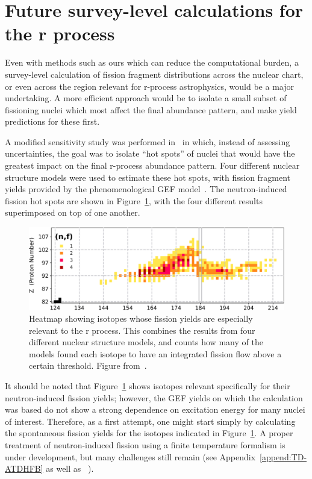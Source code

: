 \section{Future survey-level calculations for the r process}

Even with methods such as ours which can reduce the computational burden, a survey-level calculation of fission fragment distributions across the nuclear chart, or even across the region relevant for r-process astrophysics, would be a major undertaking. A more efficient approach would be to isolate a small subset of fissioning nuclei which most affect the final abundance pattern, and make yield predictions for these first.

A modified sensitivity study was performed in~\cite{Vassh2019} in which, instead of assessing uncertainties, the goal was to isolate ``hot spots'' of nuclei that would have the greatest impact on the final r-process abundance pattern. Four different nuclear structure models were used to estimate these hot spots, with fission fragment yields provided by the phenomenological GEF model~\cite{Schmidt2016}. The neutron-induced fission hot spots are shown in Figure~\ref{fig:rprocimportant-fissions}, with the four different results superimposed on top of one another.

\begin{figure}
	\centering
	\includegraphics[width=0.7\linewidth]{TeX_files/rProc_important-fissions}
	\caption[Heatmap showing isotopes whose fission yields are especially relevant to the r process. This combines the results from four different nuclear structure models, and counts how many of the models found each isotope to have an integrated fission flow above a certain threshold.]{Heatmap showing isotopes whose fission yields are especially relevant to the r process. This combines the results from four different nuclear structure models, and counts how many of the models found each isotope to have an integrated fission flow above a certain threshold. Figure from~\cite{Vassh2019}.}
	\label{fig:rprocimportant-fissions}
\end{figure}

It should be noted that Figure~\ref{fig:rprocimportant-fissions} shows isotopes relevant specifically for their neutron-induced fission yields; however, the GEF yields on which the calculation was based do not show a strong dependence on excitation energy for many nuclei of interest. Therefore, as a first attempt, one might start simply by calculating the spontaneous fission yields for the isotopes indicated in Figure~\ref{fig:rprocimportant-fissions}. A proper treatment of neutron-induced fission using a finite temperature formalism is under development, but many challenges still remain (see Appendix~\ref{append:TD-ATDHFB} as well as ~\cite{Mcdonnell2014, Schunck2014, Schunck2015b}).

